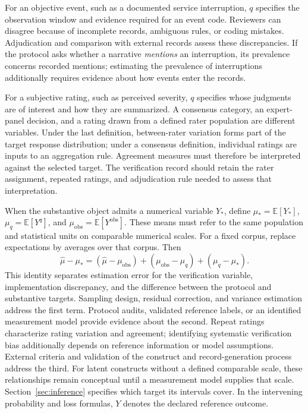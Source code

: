 \documentclass[11pt,a4paper]{article}
\newcommand{\E}{\mathbb{E}}
\begin{document}
For an objective event, such as a documented service interruption, $q$ specifies the observation window and evidence required for an event code. Reviewers can disagree because of incomplete records, ambiguous rules, or coding mistakes. Adjudication and comparison with external records assess these discrepancies. If the protocol asks whether a narrative \emph{mentions} an interruption, its prevalence concerns recorded mentions; estimating the prevalence of interruptions additionally requires evidence about how events enter the records.

For a subjective rating, such as perceived severity, $q$ specifies whose judgments are of interest and how they are summarized. A consensus category, an expert-panel decision, and a rating drawn from a defined rater population are different variables. Under the last definition, between-rater variation forms part of the target response distribution; under a consensus definition, individual ratings are inputs to an aggregation rule. Agreement measures must therefore be interpreted against the selected target. The verification record should retain the rater assignment, repeated ratings, and adjudication rule needed to assess that interpretation.

When the substantive object admits a numerical variable $Y_*$, define $\mu_*=\E[Y_*]$, $\mu_q=\E[Y^q]$, and $\mu_{\mathrm{obs}}=\E[Y^{\mathrm{obs}}]$. These means must refer to the same population and statistical units on comparable numerical scales. For a fixed corpus, replace expectations by averages over that corpus. Then
\begin{equation}
 \widehat\mu-\mu_*
 = (\widehat\mu-\mu_{\mathrm{obs}})
  +(\mu_{\mathrm{obs}}-\mu_q)
  +(\mu_q-\mu_*).
 \label{eq:measurement-decomposition}
\end{equation}
This identity separates estimation error for the verification variable, implementation discrepancy, and the difference between the protocol and substantive targets. Sampling design, residual correction, and variance estimation address the first term. Protocol audits, validated reference labels, or an identified measurement model provide evidence about the second. Repeat ratings characterize rating variation and agreement; identifying systematic verification bias additionally depends on reference information or model assumptions. External criteria and validation of the construct and record-generation process address the third. For latent constructs without a defined comparable scale, these relationships remain conceptual until a measurement model supplies that scale. Section~\ref{sec:inference} specifies which target its intervals cover. In the intervening probability and loss formulas, $Y$ denotes the declared reference outcome.
\end{document}
